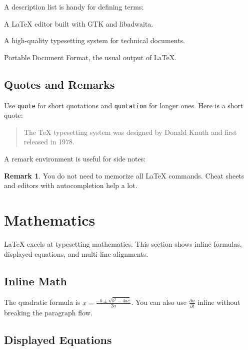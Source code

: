 \documentclass[11pt]{article}
\theoremstyle{definition}
\newtheorem{remark}[definition]{Remark}
\theoremstyle{plain}
\begin{document}
A description list is handy for defining terms:

\begin{description}[noitemsep]
    \item[NeoSetzer] A \LaTeX{} editor built with GTK and libadwaita.
    \item[\LaTeX] A high-quality typesetting system for technical documents.
    \item[PDF] Portable Document Format, the usual output of \LaTeX{}.
\end{description}

\subsection{Quotes and Remarks}
\label{sec:text:quotes}

Use \texttt{quote} for short quotations and \texttt{quotation} for
longer ones.
Here is a short quote:

\begin{quote}
    \small
    The \TeX{} typesetting system was designed by Donald Knuth
    and first released in 1978.
\end{quote}

A remark environment is useful for side notes:

\begin{remark}
    You do not need to memorize all \LaTeX{} commands.
    Cheat sheets and editors with autocompletion help a lot.
\end{remark}

\section{Mathematics}
\label{sec:math}

\LaTeX{} excels at typesetting mathematics.
This section shows inline formulas, displayed equations, and
multi-line alignments.

\subsection{Inline Math}
\label{sec:math:inline}

The quadratic formula is $x = \frac{-b \pm \sqrt{b^2 - 4ac}}{2a}$.
You can also use \(\frac{\partial u}{\partial t}\) inline without
breaking the paragraph flow.

\subsection{Displayed Equations}
\label{sec:math:display}
\end{document}
